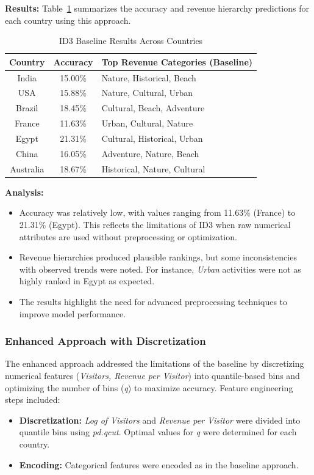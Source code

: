 \documentclass{article}
\begin{document}
\textbf{Results:} Table~\ref{tab:id3_baseline_results} summarizes the accuracy and revenue hierarchy predictions for each country using this approach.

\begin{table}[h!]
    \centering
    \begin{tabular}{|c|c|l|}
        \hline
        \textbf{Country} & \textbf{Accuracy} & \textbf{Top Revenue Categories (Baseline)} \\ \hline
        India & 15.00\% & Nature, Historical, Beach \\ 
        USA & 15.88\% & Nature, Cultural, Urban \\ 
        Brazil & 18.45\% & Cultural, Beach, Adventure \\ 
        France & 11.63\% & Urban, Cultural, Nature \\ 
        Egypt & 21.31\% & Cultural, Historical, Urban \\ 
        China & 16.05\% & Adventure, Nature, Beach \\ 
        Australia & 18.67\% & Historical, Nature, Cultural \\ \hline
    \end{tabular}
    \caption{ID3 Baseline Results Across Countries}
    \label{tab:id3_baseline_results}
\end{table}

\textbf{Analysis:}
\begin{itemize}
    \item Accuracy was relatively low, with values ranging from 11.63\% (France) to 21.31\% (Egypt). This reflects the limitations of ID3 when raw numerical attributes are used without preprocessing or optimization.
    \item Revenue hierarchies produced plausible rankings, but some inconsistencies with observed trends were noted. For instance, \textit{Urban} activities were not as highly ranked in Egypt as expected.
    \item The results highlight the need for advanced preprocessing techniques to improve model performance.
\end{itemize}

\subsubsection{Enhanced Approach with Discretization}
The enhanced approach addressed the limitations of the baseline by discretizing numerical features (\textit{Visitors, Revenue per Visitor}) into quantile-based bins and optimizing the number of bins (\textit{q}) to maximize accuracy. Feature engineering steps included:
\begin{itemize}
    \item \textbf{Discretization:} \textit{Log of Visitors} and \textit{Revenue per Visitor} were divided into quantile bins using \textit{pd.qcut}. Optimal values for \textit{q} were determined for each country.
    \item \textbf{Encoding:} Categorical features were encoded as in the baseline approach.
\end{itemize}
\end{document}
